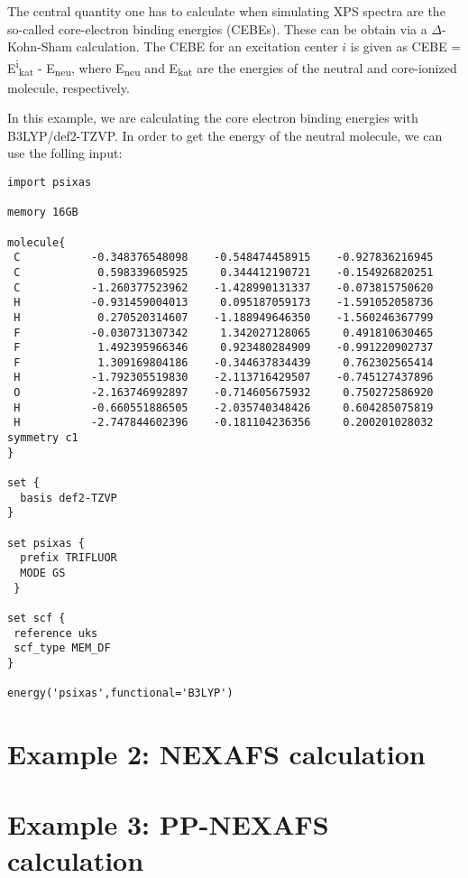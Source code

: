 \documentclass[11pt]{article}
\begin{document}
The central quantity one has to calculate when simulating XPS spectra are the so-called core-electron binding energies (CEBEs).
These can be obtain via a \(\Delta\)-Kohn-Sham calculation. The CEBE for an excitation center \(i\) is given 
as CEBE = E\textsuperscript{i}\textsubscript{kat} - E\textsubscript{neu}, where E\textsubscript{neu} and E\textsubscript{kat} are the energies of the neutral 
and core-ionized molecule, respectively.

In this example, we are calculating the core electron binding energies with B3LYP/def2-TZVP. In order to get the energy of the 
neutral molecule, we can use the folling input:
\begin{verbatim}
import psixas

memory 16GB

molecule{
 C           -0.348376548098    -0.548474458915    -0.927836216945
 C            0.598339605925     0.344412190721    -0.154926820251
 C           -1.260377523962    -1.428990131337    -0.073815750620
 H           -0.931459004013     0.095187059173    -1.591052058736
 H            0.270520314607    -1.188949646350    -1.560246367799
 F           -0.030731307342     1.342027128065     0.491810630465
 F            1.492395966346     0.923480284909    -0.991220902737
 F            1.309169804186    -0.344637834439     0.762302565414
 H           -1.792305519830    -2.113716429507    -0.745127437896
 O           -2.163746992897    -0.714605675932     0.750272586920
 H           -0.660551886505    -2.035740348426     0.604285075819
 H           -2.747844602396    -0.181104236356     0.200201028032
symmetry c1
}

set {
  basis def2-TZVP
}

set psixas {
  prefix TRIFLUOR
  MODE GS
 }

set scf {
 reference uks
 scf_type MEM_DF
}

energy('psixas',functional='B3LYP')
\end{verbatim}

\section{Example 2: NEXAFS calculation}
\label{sec:org0c3c98f}


\section{Example 3: PP-NEXAFS calculation}
\label{sec:orgfdce476}
\end{document}
